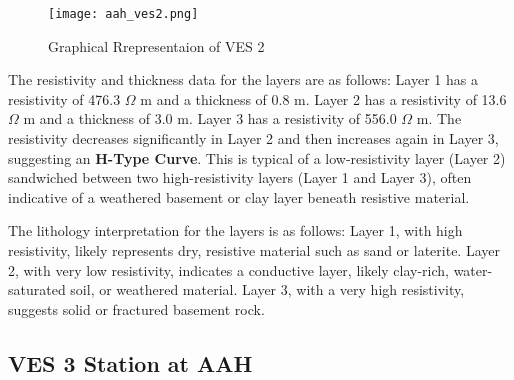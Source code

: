 \documentclass[12pt,a4paper]{report}
\begin{document}
\begin{figure}[H]
    \centering
    \texttt{[image: aah\_ves2.png]}
    \caption{Graphical Rrepresentaion of VES 2}
    \label{fig:AAH_VES_2_Curve}
\end{figure}

The resistivity and thickness data for the layers are as follows: Layer 1 has a resistivity of 476.3 $\Omega$ m and a thickness of 0.8 m. Layer 2 has a resistivity of 13.6 $\Omega$ m and a thickness of 3.0 m. Layer 3 has a resistivity of 556.0 $\Omega$ m. The resistivity decreases significantly in Layer 2 and then increases again in Layer 3, suggesting an \textbf{H-Type Curve}. This is typical of a low-resistivity layer (Layer 2) sandwiched between two high-resistivity layers (Layer 1 and Layer 3), often indicative of a weathered basement or clay layer beneath resistive material.

The lithology interpretation for the layers is as follows: Layer 1, with high resistivity, likely represents dry, resistive material such as sand or laterite. Layer 2, with very low resistivity, indicates a conductive layer, likely clay-rich, water-saturated soil, or weathered material. Layer 3, with a very high resistivity, suggests solid or fractured basement rock.

\subsection{VES 3 Station at AAH}
\end{document}
